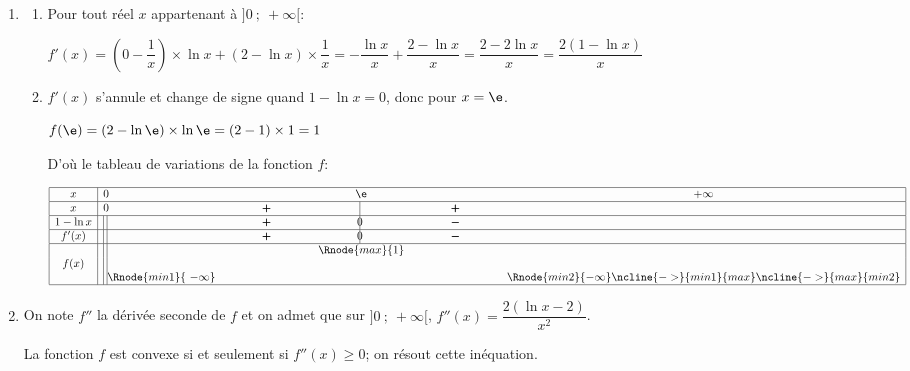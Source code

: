 \begin{enumerate}
	\item \begin{enumerate}
		\item Pour tout réel $x$ appartenant à $]0~;~+\infty[$: 
		
$f'(x)= \left (0-\dfrac{1}{x}\right ) \times \ln x + (2-\ln x)\times \dfrac{1}{x}
= -\dfrac{\ln x}{x} + \dfrac{2-\ln x}{x}
= \dfrac{2-2\ln x}{x}
= \dfrac{2 \left (1-\ln x\right )}{x}$

		\item 
$f'(x)$ s'annule et change de signe quand $1-\ln x = 0$, donc pour $x=\e$.

$f(\e)= (2-\ln\e)\times \ln\e = (2-1)\times 1=1$

D'où le tableau de variations de la fonction $f$:

\begin{center}
{\renewcommand{\arraystretch}{1.3}
\def\esp{\hspace*{2.5cm}}
\def\hauteur{0pt}
$\begin{array}{|c| l *4{c}|}
\hline
x & 0  & \esp & \e & \esp & +\infty \\ 
\hline
x & 0  &   \pmb{+} & \vline\hspace{-2.7pt}{\phantom 0} & \pmb{+} & \\ 
\hline
1-\ln x &\vline\;\vline  &   \pmb{+} & \vline\hspace{-2.7pt}0 & \pmb{-} & \\ 
\hline
f'(x) &\vline\;\vline  &   \pmb{+} & \vline\hspace{-2.7pt}0 & \pmb{-} & \\ 
\hline
 &\vline\;\vline &  &   \Rnode{max}{1}  &  &   \\  
f(x) &\vline\;\vline &     &  &  &  \rule{0pt}{\hauteur} \\ 
 &\vline\;\vline \Rnode{min1}{~-\infty} &   &  &  &   \Rnode{min2}{-\infty} \rule{0pt}{\hauteur}    
 \ncline{->}{min1}{max} 
 \ncline{->}{max}{min2} 
 \\ 
\hline
\end{array} $
}
\end{center}			

	\end{enumerate}

	\item On note $f''$ la dérivée seconde de $f$ et on admet que sur $]0~;~+\infty[$, $f''(x) = \dfrac{2(\ln x-2)}{x^{2}}$.



La fonction $f$ est convexe si et seulement si $f''(x)\geqslant 0$; on résout cette inéquation.


\end{enumerate}
